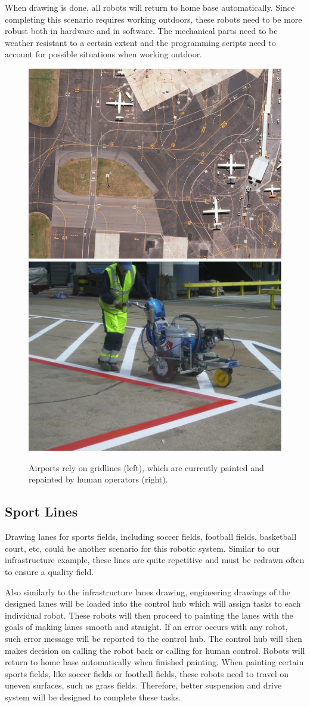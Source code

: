 When drawing is done, all robots will return to home base automatically. Since completing this scenario requires working outdoors, these robots need to be more robust both in hardware and in software. The mechanical parts need to be weather resistant to a certain extent and the programming scripts need to account for possible situations when working outdoor. 

\begin{figure}
 \centering
 \includegraphics[width=0.48\columnwidth]{figs/airport_layout.jpg}
 \includegraphics[width=0.48\columnwidth]{figs/airport_painter.png}
 \caption{Airports rely on gridlines (left), which are currently painted and repainted by human operators (right).}
 \label{fig:airport}
\end{figure}


\subsection{Sport Lines}
Drawing lanes for sports fields, including soccer fields, football fields, basketball court, etc, could be another scenario for this robotic system. Similar to our infrastructure example, these lines are quite repetitive and must be redrawn often to ensure a quality field. 

Also similarly to the infrastructure lanes drawing, engineering drawings of the designed lanes will be loaded into the control hub which will assign tasks to each individual robot. These robots will then proceed to painting the lanes with the goals of making lanes smooth and straight. If an error occurs with any robot, such error message will be reported to the control hub. The control hub will then makes decision on calling the robot back or calling for human control. Robots will return to home base automatically when finished painting. When painting certain sports fields, like soccer fields or football fields, these robots need to travel on uneven surfaces, such as grass fields. Therefore, better suspension and drive system will be designed to complete these tasks.
